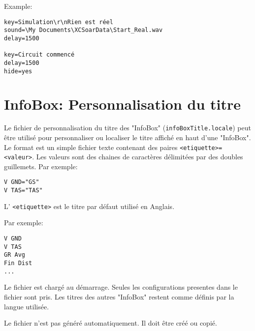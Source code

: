 Example:
\begin{verbatim}
key=Simulation\r\nRien est réel
sound=\My Documents\XCSoarData\Start_Real.wav
delay=1500

key=Circuit commencé
delay=1500
hide=yes
\end{verbatim}
% 

\section{InfoBox: Personnalisation du titre}

Le fichier de personnalisation du titre des "InfoBox"
(\verb|infoBoxTitle.locale|) peut être utilisé pour personnaliser ou localiser
le titre affiché en haut d'une "InfoBox".
Le format est un simple fichier texte contenant des paires
\verb|<etiquette>=<valeur>|. Les valeurs sont des chaines de caractères
délimitées par des doubles guillemets. Par exemple:
\begin{verbatim}
V GND="GS"
V TAS="TAS"
\end{verbatim}  

L' \verb|<etiquette>| est le titre par défaut utilisé en Anglais.

Par exemple:
\begin{verbatim}
V GND
V TAS
GR Avg
Fin Dist
...
\end{verbatim}  

Le fichier est chargé au démarrage. Seules les configurations presentes dans le
fichier sont pris. Les titres des autres "InfoBox" restent comme définis par la
langue utilisée.

Le fichier n'est pas généré automatiquement. Il doit être créé ou copié.
